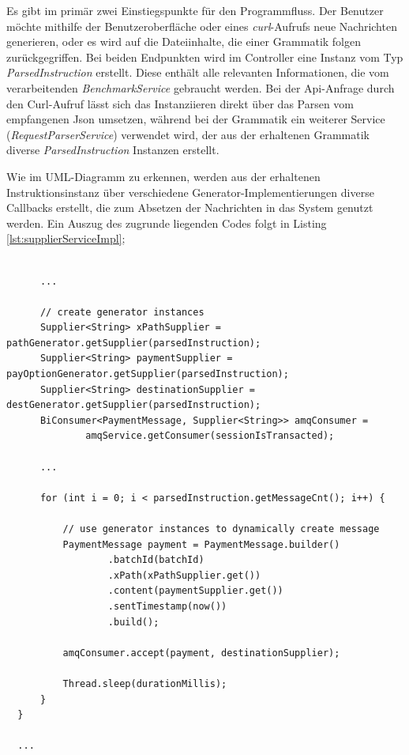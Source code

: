 Es gibt im primär zwei Einstiegspunkte für den Programmfluss. Der Benutzer möchte mithilfe der Benutzeroberfläche oder eines \emph{curl}-Aufrufs neue Nachrichten generieren, oder es wird auf die Dateiinhalte, die einer Grammatik folgen zurückgegriffen. Bei beiden Endpunkten wird im Controller eine Instanz vom Typ \emph{ParsedInstruction} erstellt. Diese enthält alle relevanten Informationen, die vom verarbeitenden \emph{BenchmarkService} gebraucht werden. Bei der Api-Anfrage durch den Curl-Aufruf lässt sich das Instanziieren direkt über das Parsen vom empfangenen Json umsetzen, während bei der Grammatik ein weiterer Service (\emph{RequestParserService}) verwendet wird, der aus der erhaltenen Grammatik diverse \emph{ParsedInstruction} Instanzen erstellt.

Wie im UML-Diagramm zu erkennen, werden aus der erhaltenen Instruktionsinstanz über verschiedene Generator-Implementierungen diverse Callbacks erstellt, die zum Absetzen der Nachrichten in das System genutzt werden. Ein Auszug des zugrunde liegenden Codes folgt in Listing \ref{lst:supplierServiceImpl};

\begin{minipage}{\linewidth}
\begin{lstlisting}[style=javaStyle,caption={Supplier - Service},label=lst:supplierServiceImpl]
  
      ...

      // create generator instances
      Supplier<String> xPathSupplier = pathGenerator.getSupplier(parsedInstruction);
      Supplier<String> paymentSupplier = payOptionGenerator.getSupplier(parsedInstruction);
      Supplier<String> destinationSupplier = destGenerator.getSupplier(parsedInstruction);
      BiConsumer<PaymentMessage, Supplier<String>> amqConsumer =
              amqService.getConsumer(sessionIsTransacted);

      ...

      for (int i = 0; i < parsedInstruction.getMessageCnt(); i++) {

          // use generator instances to dynamically create message
          PaymentMessage payment = PaymentMessage.builder()
                  .batchId(batchId)
                  .xPath(xPathSupplier.get())
                  .content(paymentSupplier.get())
                  .sentTimestamp(now())
                  .build();

          amqConsumer.accept(payment, destinationSupplier);

          Thread.sleep(durationMillis);
      }
  }

  ...
  
\end{lstlisting}
\end{minipage}

